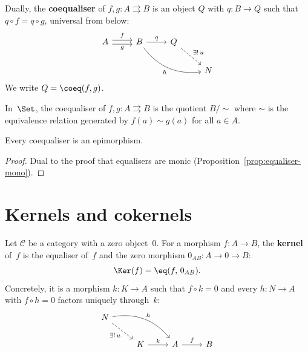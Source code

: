 \begin{definition}[Coequaliser]\label{def:coequaliser}
Dually, the \textbf{coequaliser} of $f,g\colon A\rightrightarrows B$
is an object $Q$ with $q\colon B\to Q$ such that $q\circ f = q\circ g$,
universal from below:
\[
\begin{tikzcd}
A \arrow[r, shift left, "f"] \arrow[r, shift right, "g"'] &
B \arrow[r, "q"] \arrow[rrd, bend right, "h"'] &
Q \arrow[rd, dashed, "\exists!\,u"] & \\
& & & N
\end{tikzcd}
\]
We write $Q = \coeq(f,g)$.
\end{definition}

\begin{example}\label{ex:coequaliser-set}
In~$\Set$, the coequaliser of $f,g\colon A\rightrightarrows B$ is the
quotient $B/{\sim}$ where $\sim$ is the equivalence relation generated
by $f(a)\sim g(a)$ for all $a\in A$.
\end{example}

\begin{proposition}\label{prop:coequaliser-epi}
Every coequaliser is an epimorphism.
\end{proposition}

\begin{proof}
Dual to the proof that equalisers are monic (Proposition~\ref{prop:equaliser-mono}).
\end{proof}


\section{Kernels and cokernels}\label{sec:kernels-cokernels}

\begin{definition}[Kernel]\label{def:kernel-categorical}
Let $\mathcal{C}$ be a category with a zero object~$0$.
For a morphism $f\colon A\to B$, the \textbf{kernel} of~$f$ is the
equaliser of~$f$ and the zero morphism $0_{AB}\colon A\to 0\to B$:
\[
\Ker(f) = \eq(f,\,0_{AB}).
\]
Concretely, it is a morphism $k\colon K\to A$ such that $f\circ k = 0$
and every $h\colon N\to A$ with $f\circ h = 0$ factors uniquely through~$k$:
\[
\begin{tikzcd}
N \arrow[dr, dashed, "\exists!\,u"'] \arrow[drr, bend left, "h"] & & \\
& K \arrow[r, "k"] & A \arrow[r, "f"] & B
\end{tikzcd}
\]
\end{definition}

